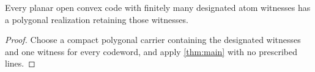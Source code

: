 \begin{corollary}\label{cor:protected}
Every planar open convex code with finitely many designated atom witnesses
has a polygonal realization retaining those witnesses.
\end{corollary}

\begin{proof}
Choose a compact polygonal carrier containing the designated witnesses and
one witness for every codeword, and apply \cref{thm:main} with no prescribed
lines.
\end{proof}
